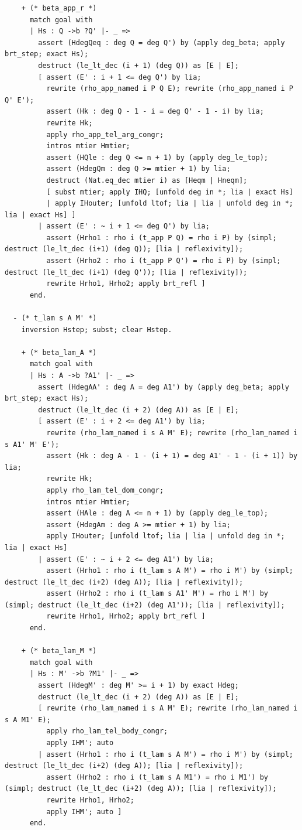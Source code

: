 \begin{latin}
\begin{verbatim}
    + (* beta_app_r *)
      match goal with
      | Hs : Q ->b ?Q' |- _ =>
        assert (HdegQeq : deg Q = deg Q') by (apply deg_beta; apply brt_step; exact Hs);
        destruct (le_lt_dec (i + 1) (deg Q)) as [E | E];
        [ assert (E' : i + 1 <= deg Q') by lia;
          rewrite (rho_app_named i P Q E); rewrite (rho_app_named i P Q' E');
          assert (Hk : deg Q - 1 - i = deg Q' - 1 - i) by lia;
          rewrite Hk;
          apply rho_app_tel_arg_congr;
          intros mtier Hmtier;
          assert (HQle : deg Q <= n + 1) by (apply deg_le_top);
          assert (HdegQm : deg Q >= mtier + 1) by lia;
          destruct (Nat.eq_dec mtier i) as [Heqm | Hneqm];
          [ subst mtier; apply IHQ; [unfold deg in *; lia | exact Hs]
          | apply IHouter; [unfold ltof; lia | lia | unfold deg in *; lia | exact Hs] ]
        | assert (E' : ~ i + 1 <= deg Q') by lia;
          assert (Hrho1 : rho i (t_app P Q) = rho i P) by (simpl; destruct (le_lt_dec (i+1) (deg Q)); [lia | reflexivity]);
          assert (Hrho2 : rho i (t_app P Q') = rho i P) by (simpl; destruct (le_lt_dec (i+1) (deg Q')); [lia | reflexivity]);
          rewrite Hrho1, Hrho2; apply brt_refl ]
      end.

  - (* t_lam s A M' *)
    inversion Hstep; subst; clear Hstep.

    + (* beta_lam_A *)
      match goal with
      | Hs : A ->b ?A1' |- _ =>
        assert (HdegAA' : deg A = deg A1') by (apply deg_beta; apply brt_step; exact Hs);
        destruct (le_lt_dec (i + 2) (deg A)) as [E | E];
        [ assert (E' : i + 2 <= deg A1') by lia;
          rewrite (rho_lam_named i s A M' E); rewrite (rho_lam_named i s A1' M' E');
          assert (Hk : deg A - 1 - (i + 1) = deg A1' - 1 - (i + 1)) by lia;
          rewrite Hk;
          apply rho_lam_tel_dom_congr;
          intros mtier Hmtier;
          assert (HAle : deg A <= n + 1) by (apply deg_le_top);
          assert (HdegAm : deg A >= mtier + 1) by lia;
          apply IHouter; [unfold ltof; lia | lia | unfold deg in *; lia | exact Hs]
        | assert (E' : ~ i + 2 <= deg A1') by lia;
          assert (Hrho1 : rho i (t_lam s A M') = rho i M') by (simpl; destruct (le_lt_dec (i+2) (deg A)); [lia | reflexivity]);
          assert (Hrho2 : rho i (t_lam s A1' M') = rho i M') by (simpl; destruct (le_lt_dec (i+2) (deg A1')); [lia | reflexivity]);
          rewrite Hrho1, Hrho2; apply brt_refl ]
      end.

    + (* beta_lam_M *)
      match goal with
      | Hs : M' ->b ?M1' |- _ =>
        assert (HdegM' : deg M' >= i + 1) by exact Hdeg;
        destruct (le_lt_dec (i + 2) (deg A)) as [E | E];
        [ rewrite (rho_lam_named i s A M' E); rewrite (rho_lam_named i s A M1' E);
          apply rho_lam_tel_body_congr;
          apply IHM'; auto
        | assert (Hrho1 : rho i (t_lam s A M') = rho i M') by (simpl; destruct (le_lt_dec (i+2) (deg A)); [lia | reflexivity]);
          assert (Hrho2 : rho i (t_lam s A M1') = rho i M1') by (simpl; destruct (le_lt_dec (i+2) (deg A)); [lia | reflexivity]);
          rewrite Hrho1, Hrho2;
          apply IHM'; auto ]
      end.


\end{verbatim}
\end{latin}
